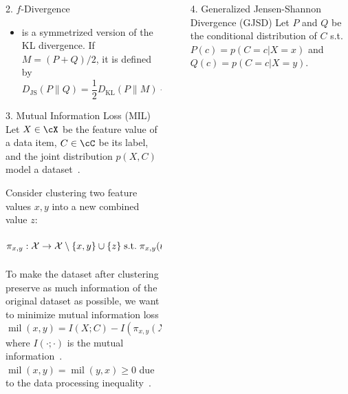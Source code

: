 \documentclass[final]{beamer}
\DeclareMathOperator{\mil}{mil}
\newcommand{\kl}[2]{D_{\mathrm{KL}}( #1 \parallel #2 )}
\newcommand{\js}[2]{D_{\mathrm{JS}}( #1 \parallel #2 )}
\newlength{\sepwid}
\newlength{\onecolwid}
\begin{document}
\begin{frame}[t]
\begin{columns}[t]
\begin{column}{\onecolwid}
\begin{block}{2. $ f $-Divergence}
\begin{itemize}
		\item {}
			 is a symmetrized version 
			of the 
			KL divergence. If 
			 $ M=(P+Q)/2 $, it 
			is defined by
			\begin{equation}\label{eq:jensen-shannon}
			\js{P}{Q} = \frac{1}{2} \kl{P}{M} + \frac{1}{2} \kl{Q}{M}\enspace.
			\end{equation}
\end{itemize}
	\end{block}
	\begin{block}{3. Mutual Information Loss (MIL)}
		Let $ X\in \cX $ be the feature value of a data item, $ C\in \cC $ be 
		its 
		label, and the joint distribution $ p(X,C) $ model a 
		dataset~\citep{bateni2019categorical}.
		
		Consider clustering two feature values $ x,y $ into a new combined 
		value $ 
		z $:
		\[ 
		\pi_{x,y}: \mathcal{X}\to \mathcal{X}\setminus\{x,y\}\cup 
		\{z\}\;\text{s.t.}\; \pi_{x,y}(t) = \begin{cases}
		t, & t\in \cX\setminus \{x, y\}\,,\\
		z, & t = x,y\,.
		\end{cases}
		\]
		To make the dataset after clustering
		preserve as much information of the original dataset as 
		possible, 
		we want to minimize
		 mutual 
		information loss 
		\[\mil(x,y) = I(X;C) - I(\pi_{x,y}(X);C)\,,\]
		where $I(\cdot;\cdot)$ is the mutual 
		information~\cite{cover2012elements}.
		$ \mil(x,y)=\mil(y,x)\ge 0 $ due to the data processing 
		inequality~\cite{cover2012elements}.
	\end{block}
		\end{column} %
 		\begin{column}{\sepwid}\end{column} %
\begin{column}{\onecolwid} %
\vspace{-40pt}

\begin{block}{4. Generalized Jensen-Shannon Divergence (GJSD)}
	 Let $P$ 
	and 
	$Q$ be the conditional distribution of $C$ s.t.\
	$ P(c) = p(C=c| X=x) $ and $ Q(c)=p(C=c| X=y) $. 
	

\end{block}
\end{column}
\end{columns}
\end{frame}
\end{document}

